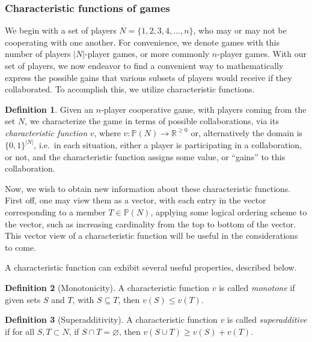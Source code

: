 \documentclass[12pt,letterpaper,final]{article}
\theoremstyle{plain}
\theoremstyle{plain}
\theoremstyle{plain}
\theoremstyle{plain}
\theoremstyle{plain}
\theoremstyle{plain}
\theoremstyle{plain}
\theoremstyle{definition}
\newtheorem{definition}{Definition}[section]
\theoremstyle{definition}
\theoremstyle{definition}
\theoremstyle{definition}
\theoremstyle{definition}
\theoremstyle{remark}
\theoremstyle{remark}
\theoremstyle{remark}
\theoremstyle{remark}
\begin{document}
\subsubsection{Characteristic functions of games}

We begin with a set of players \(N = \{1,2,3,4,\ldots, n\}\), who may
or may not be cooperating with one another. For convenience, we denote
games with this number of players \(|N|\)-player games, or more
commonly \(n\)-player games. With our set of players, we now endeavor
to find a convenient way to mathematically express the possible gains
that various subsets of players would receive if they collaborated. To
accomplish this, we utilize characteristic functions. 

\begin{definition}
  Given an \(n\)-player cooperative game, with players coming from the
  set \(N\), we characterize the game in
  terms of possible collaborations, via its \emph{characteristic function}
  \(v\), where
  \(
    v:\mathbb{P}\left(N\right) \rightarrow
    \mathbb{R}^{\geq 0} 
  \)
  or, alternatively the domain is \(\{0,1\}^{|N|}\),
  i.e.\ in each situation, either a player is participating in a
  collaboration, or not, and the characteristic function assigns some
  value, or ``gains'' to this collaboration.
\end{definition}

Now, we wish to obtain new information about these
characteristic functions. First off, one may view them as a vector,
with each entry in the vector corresponding to a member 
\(T \in \mathbb{P}\left(N\right)\), applying some logical
ordering scheme to the vector, such as increasing cardinality from the
top to bottom of the vector. This vector view of a characteristic
function will be useful in the
considerations to come.

A characteristic function can exhibit several useful properties,
described below. 

\begin{definition}[Monotonicity]\label{def:monotone}
  A characteristic function \(v\) is called \emph{monotone} if given sets
  \(S\) and \(T\), with
  \(S\subseteq T\), then
  \(
    v(S) \leq v(T).
  \)
\end{definition}


\begin{definition}[Superadditivity]\label{def:superadditvity}
  A characteristic function \(v\) is called \emph{superadditive} if for
  all \(S, T \subset N\), if \(S\cap T = \varnothing\), then
  \(
    v(S\cup T) \geq v(S) +v(T).
  \)
\end{definition}
\end{document}
